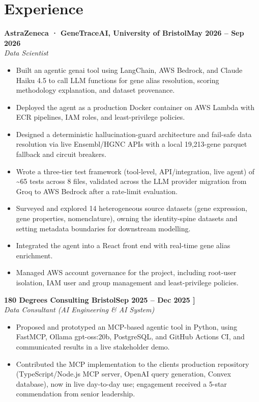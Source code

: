 \documentclass[a4paper,11pt]{article}
\newcommand{\entry}[4]{\needspace{4\baselineskip}\noindent\textbf{#1}\hfill\textbf{#2}\\ \textit{#3}\hfill\textit{#4}\par}
\begin{document}
\section{Experience}
\entry{AstraZeneca · GeneTraceAI, University of Bristol}{May 2026 – Sep 2026}{Data Scientist}{}
\begin{itemize}
  \item Built an agentic genai tool using LangChain, AWS Bedrock, and Claude Haiku 4.5 to call LLM functions for gene alias resolution, scoring methodology explanation, and dataset provenance.
  \item Deployed the agent as a production Docker container on AWS Lambda with ECR pipelines, IAM roles, and least-privilege policies.
  \item Designed a deterministic hallucination-guard architecture and fail-safe data resolution via live Ensembl/HGNC APIs with a local 19,213-gene parquet fallback and circuit breakers.
  \item Wrote a three-tier test framework (tool-level, API/integration, live agent) of \textasciitilde{}65 tests across 8 files, validated across the LLM provider migration from Groq to AWS Bedrock after a rate-limit evaluation.
  \item Surveyed and explored 14 heterogeneous source datasets (gene expression, gene properties, nomenclature), owning the identity-spine datasets and setting metadata boundaries for downstream modelling.
  \item Integrated the agent into a React front end with real-time gene alias enrichment.
  \item Managed AWS account governance for the project, including root-user isolation, IAM user and group management and least-privilege policies.
\end{itemize}
\vspace{4pt}
\entry{180 Degrees Consulting Bristol}{Sep 2025 – Dec 2025   ]}{Data Consultant (AI Engineering \& AI System)}{}
\begin{itemize}
  \item Proposed and prototyped an MCP-based agentic tool in Python, using FastMCP, Ollama gpt-oss:20b, PostgreSQL, and GitHub Actions CI, and communicated results in a live stakeholder demo.
  \item Contributed the MCP implementation to the client\textquotesingle{}s production repository (TypeScript/Node.js MCP server, OpenAI query generation, Convex database), now in live day-to-day use; engagement received a 5-star commendation from senior leadership.
\end{itemize}
\end{document}
